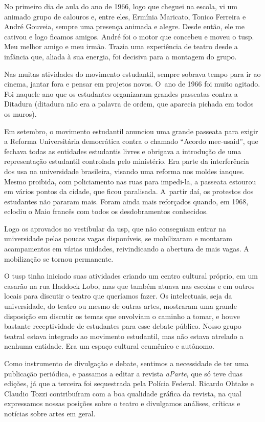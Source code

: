 {No primeiro dia de aula do ano de 1966, logo que cheguei na escola, vi um
animado grupo de calouros e, entre eles, Ermínia Maricato, Tonico Ferreira
e André Gouveia, sempre uma presença animada e alegre. Desde então,
ele me cativou e logo ficamos amigos. André foi o motor que concebeu e moveu o
{\sc tusp}. Meu melhor amigo e meu irmão. Trazia uma experiência de teatro
desde a infância que, aliada à sua energia, foi decisiva para a montagem
do grupo.

Nas muitas atividades do movimento estudantil, sempre sobrava tempo para
ir ao cinema, jantar fora e pensar em projetos novos. O~ano de 1966 foi
muito agitado. Foi naquele ano que os estudantes organizaram grandes
passeatas contra a Ditadura ({\sc ditadura não} era a palavra de
ordem, que aparecia pichada em todos os muros).

Em setembro, o movimento estudantil anunciou uma grande passeata para
exigir a Reforma Universitária democrática contra o chamado “Acordo {\sc mec-usaid}”, que fechava todas as entidades estudantis livres e
obrigava a introdução de uma representação estudantil controlada pelo
ministério. Era parte da interferência dos {\sc usa} na universidade brasileira,
visando uma reforma nos moldes ianques. Mesmo proibida, com policiamento nas
ruas para impedi-la, a passeata estourou em vários pontos da cidade, que
ficou paralisada. A~partir daí, os protestos dos estudantes não pararam
mais. Foram ainda mais reforçados quando, em 1968, eclodiu o Maio francês com todos os
desdobramentos conhecidos.

Logo os aprovados no vestibular da {\sc usp}, que não conseguiam entrar na
universidade pelas poucas vagas disponíveis, se mobilizaram e
montaram acampamentos em várias unidades, reivindicando a abertura de
mais vagas. A mobilização se tornou permanente.

O {\sc tusp} tinha iniciado suas atividades criando um centro cultural próprio,
em um casarão na rua Haddock Lobo, mas que também atuava nas escolas e em
outros locais para discutir o teatro que queríamos fazer. Os intelectuais,
seja da universidade, do teatro ou mesmo de outras artes, mostraram
uma grande disposição em discutir os temas que envolviam o caminho a
tomar, e houve bastante receptividade de estudantes para esse debate
público. Nosso grupo teatral estava integrado ao movimento estudantil,
mas não estava atrelado a nenhuma entidade. Era um espaço cultural
ecumênico e autônomo.

Como instrumento de divulgação e debate, sentimos a necessidade de ter uma
publicação periódica, e passamos a editar a revista {\it aParte}, que só teve
duas edições, já que a terceira foi sequestrada pela Polícia Federal.
Ricardo Ohtake e Claudio Tozzi contribuíram com a boa qualidade gráfica
da revista, na qual expressamos nossas posições
sobre o teatro e divulgamos análises, críticas e notícias sobre
artes em geral.

}
